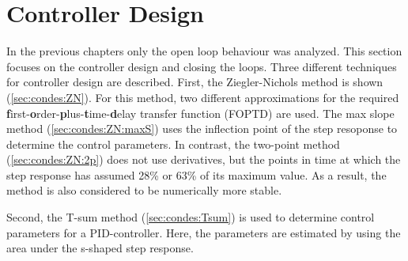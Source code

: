 \section{Controller Design} \label{sec:condes}

In the previous chapters only the open loop behaviour was analyzed.
This section focuses on the controller design and closing the loops.
Three different techniques for controller design are described.
First, the Ziegler-Nichols method is shown (\autoref{sec:condes:ZN}).
For this method, two different approximations for the required \textbf{f}irst-\textbf{o}rder-\textbf{p}lus-\textbf{t}ime-\textbf{d}elay transfer function (FOPTD) are used.
The max slope method (\autoref{sec:condes:ZN:maxS}) uses the inflection point of the step resoponse to determine the control parameters.
In contrast, the two-point method (\autoref{sec:condes:ZN:2p}) does not use derivatives, but the points in time at which the step response has assumed 28\% or 63\% of its maximum value.
As a result, the method is also considered to be numerically more stable.

Second, the T-sum method (\autoref{sec:condes:Tsum}) is used to determine control parameters for a PID-controller.
Here, the parameters are estimated by using the area under the s-shaped step response.

